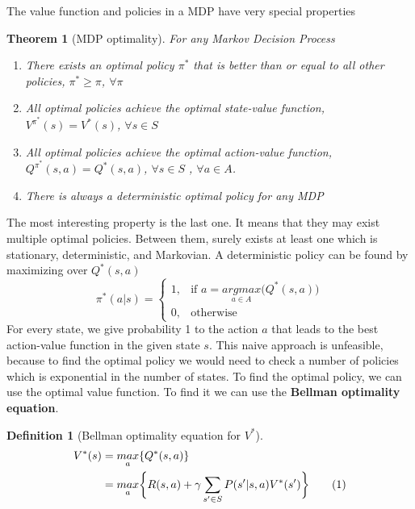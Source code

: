 \documentclass[main.tex]{subfiles}
\newcommand\numberthis{\addtocounter{equation}{1}\tag{\theequation}}
\newtheorem{theorem}{Theorem}[section]
\newtheorem{definition}{Definition}[section]
\begin{document}
The value function and policies in a MDP have very special properties
\begin{theorem}[MDP optimality]
For any Markov Decision Process
\begin{enumerate}
    \item There exists an optimal policy $\pi^*$ that is better than or equal to all other policies, $\pi^* \geq \pi$, $\forall \pi$
    \item All optimal policies achieve the optimal state-value function, $V^{\pi^*}(s) = V^*(s)$, $\forall s \in S$
    \item All optimal policies achieve the optimal action-value function, $Q^{\pi^*}(s,a) = Q^*(s,a)$, $\forall s \in S$ , $\forall a \in A$.
    \item There is always a deterministic optimal policy for any MDP
\end{enumerate}
\end{theorem}
The most interesting property is the last one. It means that they may exist multiple optimal policies. Between them, surely exists at least one which is stationary, deterministic, and Markovian. A deterministic policy can be found by maximizing over $Q^*(s,a)$
\begin{equation}
    \pi^*(a|s) = 
    \begin{cases}
        1,& \text{if } a = \underset{a \in A}{argmax} \big(Q^*(s,a)\big)\\
        0,& \text{otherwise}
    \end{cases}
\end{equation}
For every state, we give probability 1 to the action $a$ that leads to the best action-value function in the given state $s$. This naive approach is unfeasible, because to find the optimal policy we would need to check a number of policies which is exponential in the number of states.
To find the optimal policy, we can use the optimal value function. To find it we can use the \textbf{Bellman optimality equation}.
\begin{definition}[Bellman optimality equation for $V^*$]
\begin{align*}
    V^*(s) &= \underset{a}{max} \{ Q^*(s,a) \} \\
    &= \underset{a}{max} \bigg\{ R(s,a) + \gamma \sum_{s' \in S} P(s'|s,a)V^*(s') \bigg\} \numberthis
\end{align*}
\end{definition}
\end{document}
